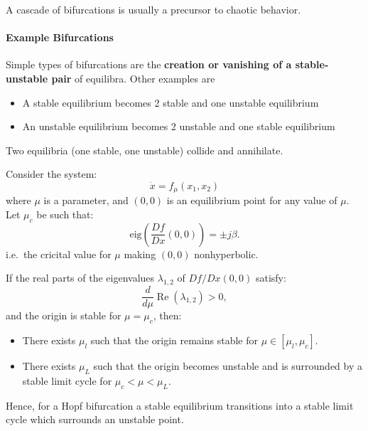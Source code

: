 \newpar{}

A cascade of bifurcations is usually a precursor to chaotic behavior.

\paragraph{Example Bifurcations}

Simple types of bifurcations are the \textbf{creation or vanishing of a stable-unstable pair} of equilibra. Other examples are

\newpar{}

\begin{itemize}
    \item A stable equilibrium becomes 2 stable and one unstable equilibrium
    \item An unstable equilibrium becomes 2 unstable and one stable equilibrium
\end{itemize}

\newpar{}

Two equilibria (one stable, one unstable) collide and annihilate.

\newpar{}

Consider the system:
\noindent\begin{equation*}
    \dot{x} = f_\mu(x_1, x_2)
\end{equation*}
where $\mu$ is a parameter, and $(0,0)$ is an equilibrium point for any value of $\mu$. Let $\mu_c$ be such that:
\noindent\begin{equation*}
    \text{eig} \left( \frac{Df}{Dx} (0,0) \right) = \pm j\beta.
\end{equation*}
i.e.\ the cricital value for $\mu$ making $(0,0)$ nonhyperbolic.

If the real parts of the eigenvalues $\lambda_{1,2}$ of $Df/Dx(0,0)$ satisfy:
\noindent\begin{equation*}
    \frac{d}{d\mu} \operatorname{Re} (\lambda_{1,2}) > 0,
\end{equation*}
and the origin is stable for $\mu = \mu_c$, then:
\begin{itemize}
    \item There exists $\mu_l$ such that the origin remains stable for $\mu \in [\mu_l, \mu_c]$.
    \item There exists $\mu_L$ such that the origin becomes unstable and is surrounded by a stable limit cycle for $\mu_c < \mu < \mu_L$.
\end{itemize}
Hence, for a Hopf bifurcation a stable equilibrium transitions into a stable limit cycle which surrounds an unstable point.

